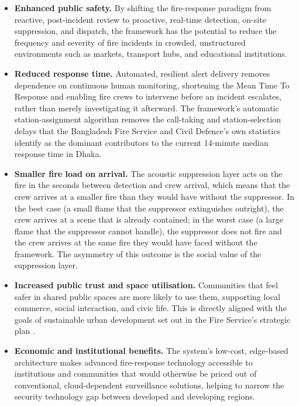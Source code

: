 \begin{itemize}
\item \textbf{Enhanced public safety.} By shifting the fire-response paradigm from reactive, post-incident review to proactive, real-time detection, on-site suppression, and dispatch, the framework has the potential to reduce the frequency and severity of fire incidents in crowded, unstructured environments such as markets, transport hubs, and educational institutions.

\item \textbf{Reduced response time.} Automated, resilient alert delivery removes dependence on continuous human monitoring, shortening the Mean Time To Response and enabling fire crews to intervene before an incident escalates, rather than merely investigating it afterward. The framework's automatic station-assignment algorithm removes the call-taking and station-selection delays that the Bangladesh Fire Service and Civil Defence's own statistics identify as the dominant contributors to the current 14-minute median response time in Dhaka.

\item \textbf{Smaller fire load on arrival.} The acoustic suppression layer acts on the fire in the seconds between detection and crew arrival, which means that the crew arrives at a smaller fire than they would have without the suppressor. In the best case (a small flame that the suppressor extinguishes outright), the crew arrives at a scene that is already contained; in the worst case (a large flame that the suppressor cannot handle), the suppressor does not fire and the crew arrives at the same fire they would have faced without the framework. The asymmetry of this outcome is the social value of the suppression layer.

\item \textbf{Increased public trust and space utilisation.} Communities that feel safer in shared public spaces are more likely to use them, supporting local commerce, social interaction, and civic life. This is directly aligned with the goals of sustainable urban development set out in the Fire Service's strategic plan \cite{fscd2021strategic}.

\item \textbf{Economic and institutional benefits.} The system's low-cost, edge-based architecture makes advanced fire-response technology accessible to institutions and communities that would otherwise be priced out of conventional, cloud-dependent surveillance solutions, helping to narrow the security technology gap between developed and developing regions.


\end{itemize}
